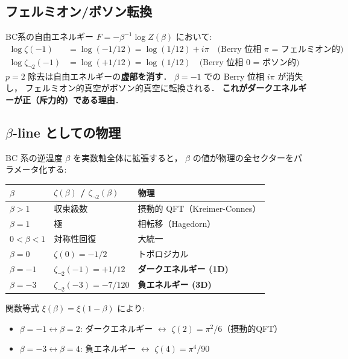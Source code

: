 \documentclass[11pt,a4paper]{article}
\begin{document}
\subsection{フェルミオン/ボソン転換}

BC系の自由エネルギー $F = -\beta^{-1}\log Z(\beta)$ において:
\begin{align}
  \log\zeta(-1) &= \log(-1/12) = \log(1/12) + i\pi
    \quad \text{(Berry 位相 $\pi$ = フェルミオン的)} \\
  \log\zeta_{\neg 2}(-1) &= \log(+1/12) = \log(1/12)
    \quad \text{(Berry 位相 $0$ = ボソン的)}
\end{align}
%
$p=2$ 除去は自由エネルギーの\textbf{虚部を消す}．
$\beta=-1$ での Berry 位相 $i\pi$ が消失し，
フェルミオン的真空がボソン的真空に転換される．
\textbf{これがダークエネルギーが正（斥力的）である理由}．

\subsection{$\beta$-line としての物理}

BC 系の逆温度 $\beta$ を実数軸全体に拡張すると，
$\beta$ の値が物理の全セクターをパラメータ化する:

\begin{center}
\begin{tabular}{lll}
\toprule
$\beta$ & $\zeta(\beta)$ / $\zeta_{\neg 2}(\beta)$ & 物理 \\
\midrule
$\beta > 1$ & 収束級数 & 摂動的 QFT（Kreimer-Connes） \\
$\beta = 1$ & 極 & 相転移（Hagedorn） \\
$0 < \beta < 1$ & 対称性回復 & 大統一 \\
$\beta = 0$ & $\zeta(0) = -1/2$ & トポロジカル \\
$\beta = -1$ & $\zeta_{\neg 2}(-1) = +1/12$ & \textbf{ダークエネルギー (1D)} \\
$\beta = -3$ & $\zeta_{\neg 2}(-3) = -7/120$ & \textbf{負エネルギー (3D)} \\
\bottomrule
\end{tabular}
\end{center}

\noindent
関数等式 $\xi(\beta) = \xi(1-\beta)$ により:
\begin{itemize}
\item $\beta = -1 \leftrightarrow \beta = 2$:
  ダークエネルギー $\leftrightarrow$ $\zeta(2) = \pi^2/6$（摂動的QFT）
\item $\beta = -3 \leftrightarrow \beta = 4$:
  負エネルギー $\leftrightarrow$ $\zeta(4) = \pi^4/90$
\end{itemize}
\end{document}
